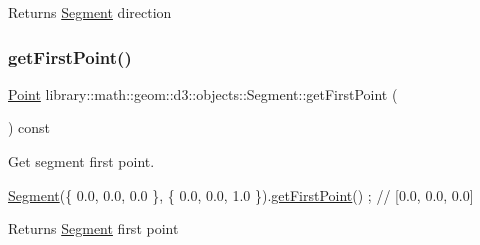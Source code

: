\begin{DoxyReturn}{Returns}
\hyperlink{classlibrary_1_1math_1_1geom_1_1d3_1_1objects_1_1_segment}{Segment} direction 
\end{DoxyReturn}
\mbox{\label{classlibrary_1_1math_1_1geom_1_1d3_1_1objects_1_1_segment_aa51ef3e713b4041f852db4201bbf7821}} 
\subsubsection{\texorpdfstring{get\+First\+Point()}{getFirstPoint()}}
{\footnotesize\ttfamily \hyperlink{classlibrary_1_1math_1_1geom_1_1d3_1_1objects_1_1_point}{Point} library\+::math\+::geom\+::d3\+::objects\+::\+Segment\+::get\+First\+Point (\begin{DoxyParamCaption}{ }\end{DoxyParamCaption}) const}



Get segment first point. 


\begin{DoxyCode}
\hyperlink{classlibrary_1_1math_1_1geom_1_1d3_1_1objects_1_1_segment_a5562342d1edf2f52e37ce1bc138ee7d7}{Segment}(\{ 0.0, 0.0, 0.0 \}, \{ 0.0, 0.0, 1.0 \}).\hyperlink{classlibrary_1_1math_1_1geom_1_1d3_1_1objects_1_1_segment_aa51ef3e713b4041f852db4201bbf7821}{getFirstPoint}() ; \textcolor{comment}{// [0.0, 0.0, 0.0]}
\end{DoxyCode}


\begin{DoxyReturn}{Returns}
\hyperlink{classlibrary_1_1math_1_1geom_1_1d3_1_1objects_1_1_segment}{Segment} first point 
\end{DoxyReturn}
\mbox{\label{classlibrary_1_1math_1_1geom_1_1d3_1_1objects_1_1_segment_a16b011c680e3102b8b44e6c88ffff81d}} 
